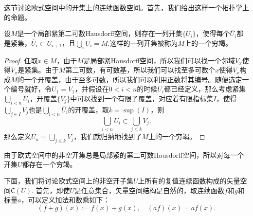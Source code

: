 这节讨论欧式空间中的开集上的连续函数空间。首先，我们给出这样一个拓扑学上的命题。

\begin{thm}\label{thm:3.4}
设$M$是一个局部紧第二可数Hausdorff空间，则存在一列开集$\{U_i\}$，使得每个$\overline{U}_i$都是紧集，$\overline{U}_i\subset U_{i+1}$，且$\bigcup_iU_i=M$.这样的一列开集被称为$M$上的一个穷竭。
\end{thm}

\begin{proof}
任取$x\in M$，由于$M$是局部紧Hausdorff空间，所以我们可以找一个邻域$V_x$使得$\overline{V}_x$是紧集。由于$M$第二可数，有可数基，所以我们可以找至多可数个$x$使得$V_x$构成$M$的一个开覆盖，由于至多可数，所以我们可以利用正数将其编号。随便选定一个编号就好，令$U_1=V_1$，并假设在$0<i<n$的时候$U_i$都已经定义，那么考虑紧集$\bigcup_{i<n}\overline{U}_i$，开覆盖$\{V_j\}$中可以找到一个有限子覆盖，对应着有限指标集$I$，使得$\bigcup_{j\in I}V_j$也是$\bigcup_{i<n}\overline{U}_i$的开覆盖，取$k=\sup(I)$，则
\[
	\bigcup_{i<n}\overline{U}_i\subset \bigcup_{j\leq k}V_j,
\]
那么定义$U_n=\bigcup_{j\leq k}V_j$，我们就归纳地找到了$M$上的一个穷竭。
\end{proof}

由于欧式空间中的非空开集总是局部紧的第二可数Hausdorff空间，所以对每一个开集$U$都存在一个穷竭。

下面，我们将讨论欧式空间上的非空开子集$U$上所有的复值连续函数构成的矢量空间$\mathsf{C}(U)$. 首先，即使$U$是任意集合，矢量空间结构是自然的，取连续函数$f$和$g$和标量$a$，可以定义加法和数乘如下：
\[
	(f+g)(x):=f(x)+g(x),\quad (af)(x)=af(x).
\]

